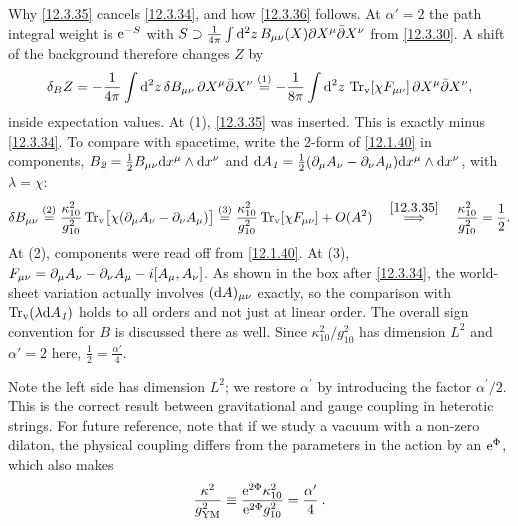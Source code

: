 \begin{tcolorbox}[breakable]
	\begin{remark}
		Why \eqref{12.3.35} cancels \eqref{12.3.34}, and how \eqref{12.3.36} follows. At $\alpha'=2$ the path integral weight is $\mathrm{e}^{-S}$ with $S\supset\frac{1}{4\pi}\int\mathrm{d}^{2}z\,B_{\mu\nu}(X)\partial X^{\mu}\bar\partial X^{\nu}$ from \eqref{12.3.30}. A shift of the background therefore changes $Z$ by
		\begin{align*}
			\delta_{B}Z=-\frac{1}{4\pi}\int\mathrm{d}^{2}z\,\delta B_{\mu\nu}\,\partial X^{\mu}\bar\partial X^{\nu}
			\overset{(1)}{=} -\frac{1}{8\pi}\int\mathrm{d}^{2}z\,\operatorname{Tr}_{\mathrm v}[\chi F_{\mu\nu}]\,\partial X^{\mu}\bar\partial X^{\nu} ,
		\end{align*}
		inside expectation values. At (1), \eqref{12.3.35} was inserted. This is exactly minus \eqref{12.3.34}. To compare with spacetime, write the 2-form of \eqref{12.1.40} in components, $B_{\textit{2}}=\frac12B_{\mu\nu}\mathrm{d} x^{\mu}\wedge\mathrm{d} x^{\nu}$ and $\mathrm{d} A_{\textit{1}}=\frac12(\partial_{\mu}A_{\nu}-\partial_{\nu}A_{\mu})\mathrm{d} x^{\mu}\wedge\mathrm{d} x^{\nu}$, with $\lambda=\chi$:
		\begin{align*}
			\delta B_{\mu\nu}\overset{(2)}{=} \frac{\kappa_{10}^{2}}{g_{10}^{2}}\operatorname{Tr}_{\mathrm v}\bigl[\chi(\partial_{\mu}A_{\nu}-\partial_{\nu}A_{\mu})\bigr]
			\overset{(3)}{=} \frac{\kappa_{10}^{2}}{g_{10}^{2}}\operatorname{Tr}_{\mathrm v}[\chi F_{\mu\nu}]+O(A^{2})
			\quad\overset{\eqref{12.3.35}}{\Longrightarrow}\quad \frac{\kappa_{10}^{2}}{g_{10}^{2}}=\frac12 .
		\end{align*}
		At (2), components were read off from \eqref{12.1.40}. At (3), $F_{\mu\nu}=\partial_{\mu}A_{\nu}-\partial_{\nu}A_{\mu}-i[A_{\mu},A_{\nu}]$. As shown in the box after \eqref{12.3.34}, the world-sheet variation actually involves $(\mathrm{d} A)_{\mu\nu}$ exactly, so the comparison with $\operatorname{Tr}_{\mathrm v}(\lambda\mathrm{d} A_{\textit{1}})$ holds to all orders and not just at linear order. The overall sign convention for $B$ is discussed there as well. Since $\kappa^{2}_{10}/g^{2}_{10}$ has dimension $L^{2}$ and $\alpha'=2$ here, $\frac12=\frac{\alpha'}{4}$.
	\end{remark}
\end{tcolorbox}
Note the left side has dimension $L^2$; we restore $\alpha^{\prime}$ by introducing the factor $\alpha^{\prime}/2$. This is the correct result between gravitational and gauge coupling in heterotic strings. For future reference, note that if we study a vacuum with a non-zero dilaton, the physical coupling differs from the parameters in the action by an $\mathrm{e}^{\Phi}$, which also makes
\begin{equation}
	\frac{\kappa^{2}}{g^{2}_{\mathrm{YM}}} \equiv \frac{\mathrm{e}^{2\Phi}\kappa_{10}^{2}}{\mathrm{e}^{2\Phi}g_{10}^{2}}=\frac{\alpha^{\prime}}{4} \:. \label{12.3.37}
\end{equation}

